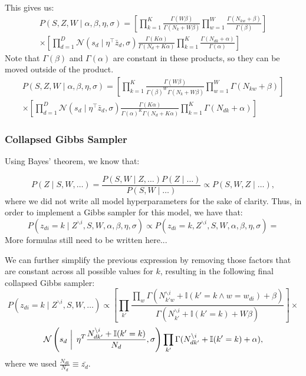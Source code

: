 \documentclass[a4paper,10pt]{article}
\begin{document}
This gives us:
\begin{equation}
\begin{gathered}
P(S, Z, W \mid \alpha, \beta, \eta, \sigma) =  \left[ \prod_{k = 1}^K \frac{ \Gamma(W\beta)}{\Gamma(N_k + W\beta)} \prod_{w = 1}^W \frac{\Gamma(N_{kw}+\beta)}{\Gamma(\beta)}\right]  \\
\times\left[ \prod_{d = 1}^D \mathcal{N}(s_d \mid \eta^\top \bar{z}_d, \sigma) \frac{\Gamma(K\alpha)}{\Gamma(N_d + K \alpha)} \prod_{k = 1}^K \frac{\Gamma(N_{dk} + \alpha)}{\Gamma(\alpha)} \right]
\end{gathered}
\end{equation}
Note that $\Gamma(\beta)$ and $\Gamma(\alpha)$ are constant in these products, so they can be moved outside of the product.
\begin{equation}
\begin{gathered}
P(S, Z, W \mid \alpha, \beta, \eta, \sigma) = \left[ \prod_{k = 1}^K \frac{ \Gamma(W\beta)}{\Gamma(\beta)^W \Gamma(N_k + W\beta)} \prod_{w = 1}^W \Gamma(N_{kw}+\beta)\right]\\
\times\left[ \prod_{d = 1}^D \mathcal{N}(s_d \mid \eta^\top \bar{z}_d, \sigma) \frac{\Gamma(K\alpha)}{\Gamma(\alpha)^K \Gamma(N_d + K \alpha)} \prod_{k = 1}^K \Gamma(N_{dk} + \alpha) \right]
\end{gathered}
\end{equation}

\subsubsection{Collapsed Gibbs Sampler}

Using Bayes' theorem, we know that:

\begin{equation}
P(Z \mid S, W, \dots) = \frac{P(S, W \mid Z, \dots) P(Z \mid \dots)}{P(S, W \mid \dots)} \propto P(S, W, Z \mid \dots),
\end{equation}
where we did not write all model hyperparameters for the sake of clarity.
Thus, in order to implement a Gibbs sampler for this model, we have that:
\[P(z_{di} = k \mid Z^{\backslash{i}}, S, W, \alpha, \beta, \eta, \sigma) \propto P(z_{di} = k, Z^{\backslash{i}}, S, W, \alpha, \beta, \eta, \sigma) = \]
More formulas still need to be written here... %

We can further simplify the previous expression by removing those factors that are constant across all possible values for $k$, resulting in the following final collapsed Gibbs sampler:
\[P(z_{di} = k \mid Z^{\backslash{i}}, S, W, \dots) \propto \left[ \prod_{k'} \frac{\prod_w \Gamma(N_{{k'}w}^{\backslash i} + \mathbb{I}(k' = k \wedge w = w_{di}) + \beta)}{\Gamma(N_{k'}^{\backslash i} + \mathbb{I}(k' = k) + W \beta)} \right] \times \]
\begin{equation}
\mathcal{N}\left(s_d\, \left| \vphantom{\frac{1}{1}} \right. \, \eta^T \frac{N_{d{k'}}^{\backslash i} + \mathbb{I}(k' = k)}{N_d}, \sigma \right) \prod_{k'} \Gamma(N_{d{k'}}^{\backslash i} + \mathbb{I}(k' = k) + \alpha),
\end{equation}
where we used $ \frac{N_{dk}}{N_d} \equiv \bar{z_d} $. 
\end{document}

